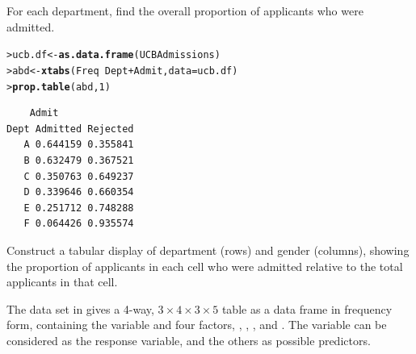 \documentclass[10pt]{report}\usepackage[]{graphicx}\usepackage[]{color}
\makeatletter
\newcommand{\hlnum}[1]{\textcolor[rgb]{0.686,0.059,0.569}{#1}}%
\newcommand{\hlopt}[1]{\textcolor[rgb]{0,0,0}{#1}}%
\newcommand{\hlstd}[1]{\textcolor[rgb]{0.345,0.345,0.345}{#1}}%
\newcommand{\hlkwb}[1]{\textcolor[rgb]{0.69,0.353,0.396}{#1}}%
\newcommand{\hlkwc}[1]{\textcolor[rgb]{0.333,0.667,0.333}{#1}}%
\newcommand{\hlkwd}[1]{\textcolor[rgb]{0.737,0.353,0.396}{\textbf{#1}}}%
\newenvironment{kframe}{%
 \def\at@end@of@kframe{}%
 \ifinner\ifhmode%
  \def\at@end@of@kframe{\end{minipage}}%
  \begin{minipage}{\columnwidth}%
 \fi\fi%
 \def\FrameCommand##1{\hskip\@totalleftmargin \hskip-\fboxsep
 \colorbox{shadecolor}{##1}\hskip-\fboxsep
     \hskip-\linewidth \hskip-\@totalleftmargin \hskip\columnwidth}%
 \MakeFramed {\advance\hsize-\width
   \@totalleftmargin\z@ \linewidth\hsize
   \@setminipage}}%
 {\par\unskip\endMakeFramed%
 \at@end@of@kframe}
\newenvironment{knitrout}{}{} %
\renewenvironment{knitrout}{\small\renewcommand{\baselinestretch}{.85}}{} %
\makeatother
\begin{document}
\begin{Exercises}
\begin{enumerate*}
    \item For each department, find the overall proportion of applicants who were admitted.
    \begin{ans}
\begin{knitrout}\footnotesize
{}\color{fgcolor}\begin{kframe}
\begin{alltt}
\hlstd{> }\hlstd{ucb.df} \hlkwb{<-} \hlkwd{as.data.frame}\hlstd{(UCBAdmissions)}
\hlstd{> }\hlstd{abd} \hlkwb{<-} \hlkwd{xtabs}\hlstd{(Freq} \hlopt{~} \hlstd{Dept} \hlopt{+} \hlstd{Admit,} \hlkwc{data}\hlstd{=ucb.df)}
\hlstd{> }\hlkwd{prop.table}\hlstd{(abd,} \hlnum{1}\hlstd{)}
\end{alltt}
\begin{verbatim}
    Admit
Dept Admitted Rejected
   A 0.644159 0.355841
   B 0.632479 0.367521
   C 0.350763 0.649237
   D 0.339646 0.660354
   E 0.251712 0.748288
   F 0.064426 0.935574
\end{verbatim}
\end{kframe}
\end{knitrout}
    \end{ans}
        
    \item Construct a tabular display of department (rows) and gender (columns), showing
    the proportion of applicants in each cell who were admitted
    relative to the total applicants in that cell.
    \begin{ans}
    \end{ans}
        
  \end{enumerate*}

\exercise The data set  in  
gives a 4-way, $3 \times 4 \times 3 \times 5$ 
table as a data frame in
frequency form, containing the variable  and four factors,
,
,
, and
.  The variable  can be considered as the
response variable, and the others as possible predictors.


\end{Exercises}
\end{document}
